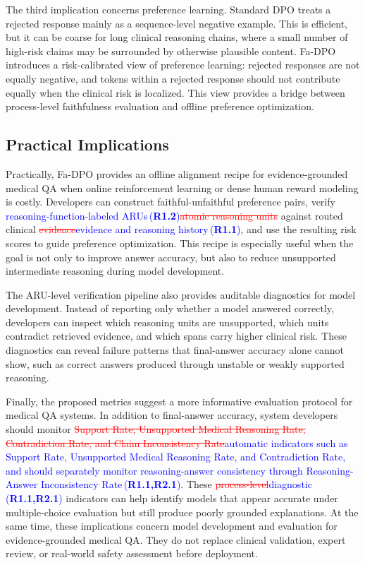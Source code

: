 \documentclass[a4paper,fleqn,doubleblind]{cas-sc}
\DeclareRobustCommand{\deleted}[1]{\textcolor{red}{\sout{#1}}}
\DeclareRobustCommand{\added}[1]{\textcolor{blue}{#1}}
\DeclareRobustCommand{\revtag}[1]{\textcolor{blue}{\scriptsize\,(\textbf{#1})}}
\begin{document}
The third implication concerns preference learning. Standard DPO treats a rejected response mainly as a sequence-level negative example. This is efficient, but it can be coarse for long clinical reasoning chains, where a small number of high-risk claims may be surrounded by otherwise plausible content. Fa-DPO introduces a risk-calibrated view of preference learning: rejected responses are not equally negative, and tokens within a rejected response should not contribute equally when the clinical risk is localized. This view provides a bridge between process-level faithfulness evaluation and offline preference optimization.

\subsection{Practical Implications}
Practically, Fa-DPO provides an offline alignment recipe for evidence-grounded medical QA when online reinforcement learning or dense human reward modeling is costly. Developers can construct faithful-unfaithful preference pairs, verify \added{reasoning-function-labeled ARUs}\revtag{R1.2}\deleted{atomic reasoning units} against routed clinical \deleted{evidence}\added{evidence and reasoning history}\revtag{R1.1}, and use the resulting risk scores to guide preference optimization. This recipe is especially useful when the goal is not only to improve answer accuracy, but also to reduce unsupported intermediate reasoning during model development.

The ARU-level verification pipeline also provides auditable diagnostics for model development. Instead of reporting only whether a model answered correctly, developers can inspect which reasoning units are unsupported, which units contradict retrieved evidence, and which spans carry higher clinical risk. These diagnostics can reveal failure patterns that final-answer accuracy alone cannot show, such as correct answers produced through unstable or weakly supported reasoning.

Finally, the proposed metrics suggest a more informative evaluation protocol for medical QA systems. In addition to final-answer accuracy, system developers should monitor \deleted{Support Rate, Unsupported Medical Reasoning Rate, Contradiction Rate, and Claim Inconsistency Rate}\added{automatic indicators such as Support Rate, Unsupported Medical Reasoning Rate, and Contradiction Rate, and should separately monitor reasoning-answer consistency through Reasoning-Answer Inconsistency Rate}\revtag{R1.1,R2.1}. These \deleted{process-level}\added{diagnostic}\revtag{R1.1,R2.1} indicators can help identify models that appear accurate under multiple-choice evaluation but still produce poorly grounded explanations. At the same time, these implications concern model development and evaluation for evidence-grounded medical QA. They do not replace clinical validation, expert review, or real-world safety assessment before deployment.
\end{document}
